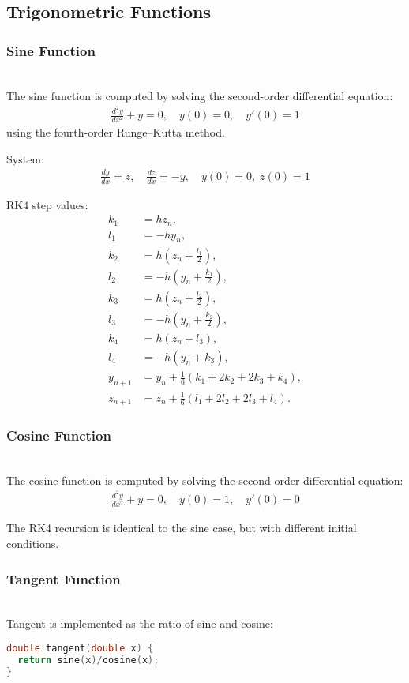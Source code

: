 \documentclass[conference]{IEEEtran}
\begin{document}
\subsection{Trigonometric Functions}

\subsubsection{Sine Function} \\
The sine function \cite{ncert12} is computed by solving the second-order differential equation:
\begin{align}
\frac{d^2y}{dx^2} + y = 0, \quad y(0)=0, \quad y'(0)=1
\end{align}
using the fourth-order Runge--Kutta method.

System:
\begin{align}
\frac{dy}{dx}=z, \quad \frac{dz}{dx}=-y, \quad y(0)=0, \; z(0)=1
\end{align}

RK4 step values:
\begin{align}
k_1 &= h z_n, \\
l_1 &= -h y_n, \\
k_2 &= h \left(z_n+\tfrac{l_1}{2}\right), \\
l_2 &= -h \left(y_n+\tfrac{k_1}{2}\right), \\
k_3 &= h \left(z_n+\tfrac{l_2}{2}\right), \\
l_3 &= -h \left(y_n+\tfrac{k_2}{2}\right), \\
k_4 &= h(z_n+l_3), \\
l_4 &= -h(y_n+k_3), \\
y_{n+1} &= y_n+\frac{1}{6}(k_1+2k_2+2k_3+k_4), \\
z_{n+1} &= z_n+\tfrac{1}{6}(l_1+2l_2+2l_3+l_4).
\end{align}

\subsubsection{Cosine Function} \\
The cosine function \cite{ncert12} is computed by solving the second-order differential equation:
\begin{align}
\frac{d^2y}{dx^2} + y = 0, \quad y(0)=1, \quad y'(0)=0
\end{align}

The RK4 recursion is identical to the sine case, but with different initial conditions.


\subsubsection{Tangent Function} \\
Tangent \cite{ncert12} is implemented as the ratio of sine and cosine:
\begin{lstlisting}[language=C, caption={C Implementation of Tangent Function}]
double tangent(double x) {
  return sine(x)/cosine(x);
}
\end{lstlisting}
\end{document}
